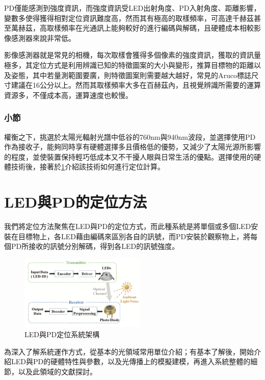             PD僅能感測到強度資訊，而強度資訊受LED出射角度、PD入射角度、距離影響，變數多使得獲得相對定位資訊難度高，然而其有極高的取樣頻率，可高達千赫茲甚至萬赫茲，高取樣頻率在光通訊上能夠較好的進行編碼與解碼，且硬體成本相較影像感測器來說非常低。

            影像感測器就是常見的相機，每次取樣會獲得多個像素的強度資訊，獲取的資訊量極多，其定位方式是利用辨識已知的特徵圖案的大小與變形，推算目標物的距離以及姿態，其中若量測範圍要廣，則特徵圖案則需要越大越好，常見的Aruco標誌尺寸建議在16公分以上。然而其取樣頻率大多在百赫茲內，且視覺辨識所需要的運算資源多，不僅成本高，運算速度也較慢。



        \subsubsection{小節}
        
        

        權衡之下，挑選於太陽光輻射光譜中低谷的760nm與940nm波段，並選擇使用PD作為接收子，能夠同時享有硬體選擇多且價格低的優勢，又減少了太陽光源所影響的程度，並使裝置保持輕巧低成本又不干擾人眼與日常生活的優點。選擇使用的硬體技術後，接著於\ref{chp:LEDandPD}介紹該技術如何進行定位計算。


\section{LED與PD的定位方法}
\label{chp:LEDandPD}
    我們將定位方法聚焦在LED與PD的定位方式，而此種系統是將單個或多個LED安裝在目標物上，各LED藉由編碼來區別各自的訊號，而PD安裝於觀察物上，將每個PD所接收的訊號分別解碼，得到各LED的訊號強度。

    \begin{figure}[ht]
        \centering
        \includegraphics[width=6cm]{ch2pic/vlc.png}
        \caption{LED與PD定位系統架構\cite{decoding}}
        \label{pic:vlc}
    \end{figure}

    為深入了解系統運作方式，從基本的光領域常用單位介紹；有基本了解後，開始介紹LED與PD的硬體特性與參數，以及光傳播上的模擬建模，再進入系統整體的細節，以及此領域的文獻探討。

